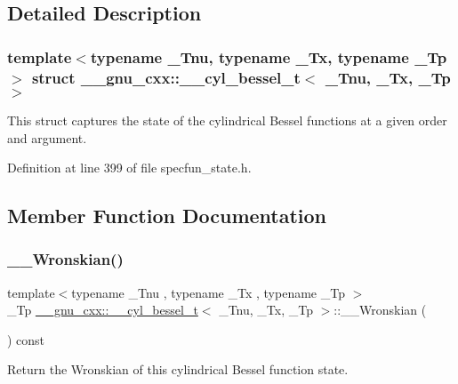 \subsection{Detailed Description}
\subsubsection*{template$<$typename \+\_\+\+Tnu, typename \+\_\+\+Tx, typename \+\_\+\+Tp$>$\newline
struct \+\_\+\+\_\+gnu\+\_\+cxx\+::\+\_\+\+\_\+cyl\+\_\+bessel\+\_\+t$<$ \+\_\+\+Tnu, \+\_\+\+Tx, \+\_\+\+Tp $>$}

This struct captures the state of the cylindrical Bessel functions at a given order and argument. 

Definition at line 399 of file specfun\+\_\+state.\+h.



\subsection{Member Function Documentation}
\mbox{\label{struct____gnu__cxx_1_1____cyl__bessel__t_aa311a0f4636243a07d0c1d0660e5c213}} 
\subsubsection{\texorpdfstring{\+\_\+\+\_\+\+Wronskian()}{\_\_Wronskian()}}
{\footnotesize\ttfamily template$<$typename \+\_\+\+Tnu , typename \+\_\+\+Tx , typename \+\_\+\+Tp $>$ \\
\+\_\+\+Tp \hyperlink{struct____gnu__cxx_1_1____cyl__bessel__t}{\+\_\+\+\_\+gnu\+\_\+cxx\+::\+\_\+\+\_\+cyl\+\_\+bessel\+\_\+t}$<$ \+\_\+\+Tnu, \+\_\+\+Tx, \+\_\+\+Tp $>$\+::\+\_\+\+\_\+\+Wronskian (\begin{DoxyParamCaption}{ }\end{DoxyParamCaption}) const\hspace{0.3cm}{\ttfamily [inline]}}



Return the Wronskian of this cylindrical Bessel function state. 



